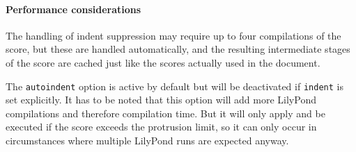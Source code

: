 \documentclass{scrartcl}
\begin{document}
\paragraph{Performance considerations}
The handling of indent suppression may require up to four compilations of the
score, but these are handled automatically, and the resulting intermediate
stages of the score are cached just like the scores actually used in the
document.

The \texttt{autoindent} option is active by default but will be deactivated if
\texttt{indent} is set explicitly. It has to be noted that this option will add
more LilyPond compilations and therefore compilation time. But it will only
apply and be executed if the score exceeds the protrusion limit, so it can only
occur in circumstances where multiple LilyPond runs are expected anyway.
\end{document}
